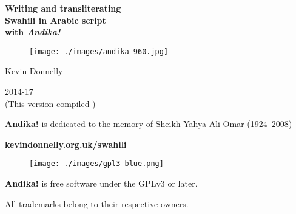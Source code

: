 \begin{titlepage}
\begin{center}

{\Huge\textbf{Writing and transliterating}}\\[0.5cm]
{\Huge\textbf{Swahili in Arabic script}}\\[0.5cm]
{\Huge\textbf{with \textit{Andika!}}}

\vspace{2cm}

\begin{figure}[h]
 \centering
 \texttt{[image: ./images/andika-960.jpg]}
\end{figure}
\vspace{2cm}


{\LARGE{Kevin Donnelly}}
\vspace{1.5cm}

{\Large{2014-17}}\\
(This version compiled \todayuk)

\vspace{1.5cm}
\textbf{Andika!} is dedicated to the memory of Sheikh Yahya Ali Omar (1924--2008)\\

\textbf{kevindonnelly.org.uk/swahili}
\begin{figure}[H]
 \centering
 \texttt{[image: ./images/gpl3-blue.png]}
\end{figure}

\textbf{Andika!} is free software under the GPLv3 or later.

All trademarks belong to their respective owners.

\end{center}
\end{titlepage}


\tableofcontents  %
\listoffigures
\listoftables

